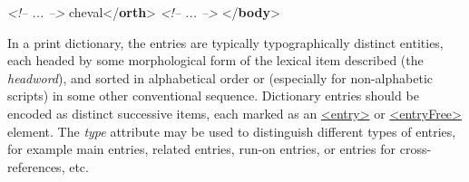 \begin{shaded}
\textit{<!-- ... -->}\mbox{}\newline 
\hspace*{1em}\mbox{}\newline 
\hspace*{1em}\mbox{}\newline 
\hspace*{1em}\hspace*{1em}\mbox{}\newline 
\hspace*{1em}\hspace*{1em}\hspace*{1em}cheval{</\textbf{orth}>}\mbox{}\newline 
\hspace*{1em}\hspace*{1em}\mbox{}\newline 
\textit{<!-- ... -->}\mbox{}\newline 
\hspace*{1em}\mbox{}\newline 
{}\mbox{}\newline 
{</\textbf{body}>}\end{shaded}\egroup\par \par
In a print dictionary, the entries are typically typographically distinct entities, each headed by some morphological form of the lexical item described (the \textit{headword}), and sorted in alphabetical order or (especially for non-alphabetic scripts) in some other conventional sequence. Dictionary entries should be encoded as distinct successive items, each marked as an \hyperref[TEI.entry]{<entry>} or \hyperref[TEI.entryFree]{<entryFree>} element. The {\itshape type} attribute may be used to distinguish different types of entries, for example main entries, related entries, run-on entries, or entries for cross-references, etc.\par
